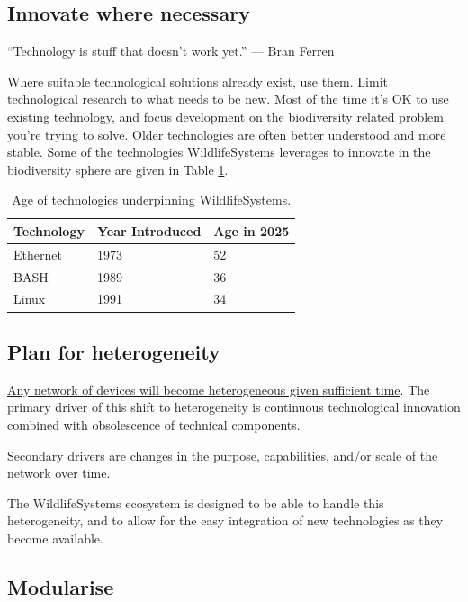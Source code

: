 \documentclass[
]{book}
\begin{document}
\subsection{Innovate where necessary}\label{innovate-where-necessary}

``Technology is stuff that doesn't work yet.''
\hfill --- Bran Ferren

Where suitable technological solutions already exist, use them. Limit technological research to what needs to be new. Most of the time it's OK to use existing technology, and focus development on the biodiversity related problem you're trying to solve. Older technologies are often better understood and more stable. Some of the technologies WildlifeSystems leverages to innovate in the biodiversity sphere are given in Table \ref{tab:tech-age}.

\begin{table}

\caption{\label{tab:tech-age}Age of technologies underpinning WildlifeSystems.}
\centering
\begin{tabular}[t]{l|l|l}
\hline
Technology & Year Introduced & Age in  2025\\
\hline
Ethernet & 1973 & 52\\
\hline
BASH & 1989 & 36\\
\hline
Linux & 1991 & 34\\
\hline
\end{tabular}
\end{table}

\subsection{Plan for heterogeneity}\label{plan-for-heterogeneity}

\href{https://medium.ebaker.me.uk/sensor-networks1-abstracting-heterogeneity-319c0c41c9fa}{Any network of devices will become heterogeneous given sufficient time}. The primary driver of this shift to heterogeneity is continuous technological innovation combined with obsolescence of technical components.

Secondary drivers are changes in the purpose, capabilities, and/or scale of the network over time.

The WildlifeSystems ecosystem is designed to be able to handle this heterogeneity, and to allow for the easy integration of new technologies as they become available.

\subsection{Modularise}\label{modularise}
\end{document}
